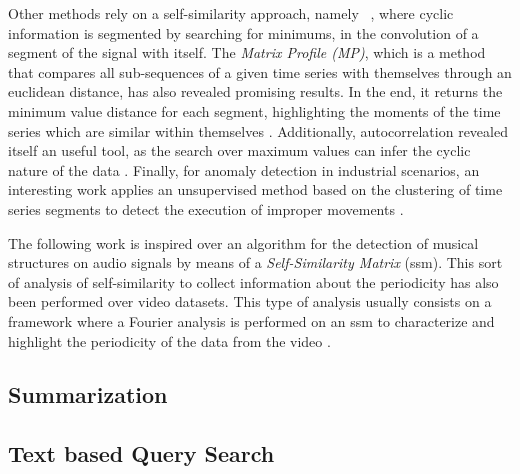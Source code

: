\par
Other methods rely on a self-similarity approach, namely ~\cite{neuza}, where cyclic information is segmented by searching for minimums, in the convolution of a segment of the signal with itself. The \textit{Matrix Profile (MP)}, which is a method that compares all sub-sequences of a given time series with themselves through an euclidean distance, has also revealed promising results. In the end, it returns the minimum value distance for each segment, highlighting the moments of the time series which are similar within themselves \cite{Yeh2018}. Additionally, autocorrelation revealed itself an useful tool, as the search over maximum values can infer the cyclic nature of the data \cite{Bauters2014}. Finally, for anomaly detection in industrial scenarios, an interesting work applies an unsupervised method based on the clustering of time series segments to detect the execution of improper movements \cite{Varandas19}. 
\par
The following work is inspired over an algorithm for the detection of musical structures on audio signals \cite{foote2000, audiolabs1, audiolabs2} by means of a \textit{Self-Similarity Matrix } (\gls{ssm}). This sort of analysis of self-similarity to collect information about the periodicity has also been performed over video datasets. This type of analysis usually consists on a framework where a Fourier analysis is performed on an \gls{ssm} to characterize and highlight the periodicity of the data from the video \cite{Cutler2002,Cutler2000,Cutler1999}.

\subsection{Summarization}


\subsection{Text based Query Search}

